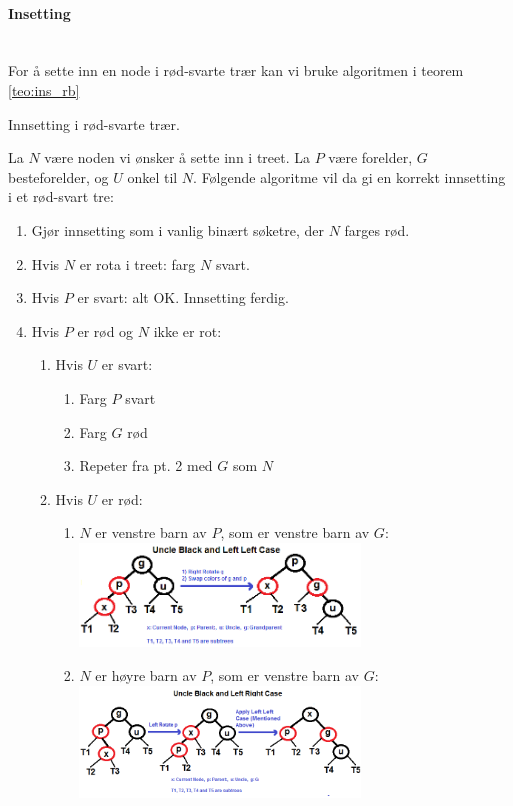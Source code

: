 \paragraph{Insetting}~\\
For å sette inn en node i rød-svarte trær kan vi bruke algoritmen i teorem \ref{teo:ins_rb}
\begin{teorem} Innsetting i rød-svarte trær. \label{teo:ins_rb}

La $ N $ være noden vi ønsker å sette inn i treet. La $ P $ være forelder, $ G $ besteforelder, og $ U $ onkel til $ N $. Følgende algoritme vil da gi en korrekt innsetting i et rød-svart tre:
\begin{enumerate}
\item Gjør innsetting som i vanlig binært søketre, der $ N $ farges rød.
\item Hvis $ N $ er rota i treet: farg $ N $ svart. 
\item Hvis $ P $ er svart: alt OK. Innsetting ferdig. 
\item Hvis $ P $ er rød og $ N $ ikke er rot:
	\begin{enumerate}
		\item Hvis $ U $ er svart:
		\begin{enumerate}
			\item Farg $ P $ svart
			\item Farg $ G $ rød
			\item Repeter fra pt. 2 med $ G $ som $ N $
		\end{enumerate}
		\item Hvis $ U $ er rød:
		\begin{enumerate}
			\item $ N $ er venstre barn av $ P $, som er venstre barn av $ G $:\\
			\includegraphics[width=0.65\textwidth]{rbt_ll.png}\\

			\item $ N $ er høyre barn av $ P $, som er venstre barn av $ G $:\\
			\includegraphics[width=0.65\textwidth]{rbt_lr.png}\\
			

\end{enumerate}
\end{enumerate}
\end{enumerate}
\end{teorem}

